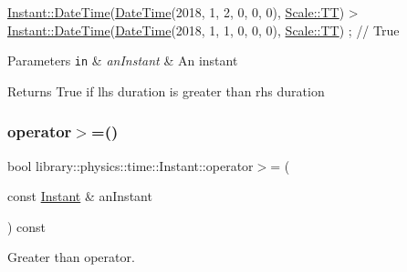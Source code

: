 \begin{DoxyCode}
\hyperlink{classlibrary_1_1physics_1_1time_1_1_instant_ac827b6ffa57ce75a3c56c462d4c872f8}{Instant::DateTime}(\hyperlink{classlibrary_1_1physics_1_1time_1_1_instant_ac827b6ffa57ce75a3c56c462d4c872f8}{DateTime}(2018, 1, 2, 0, 0, 0), 
      \hyperlink{namespacelibrary_1_1physics_1_1time_a09d2bc9fbc7b0b5f92e1419bd655e6bbadf1f3edb9115acb0a1e04209b7a9937b}{Scale::TT}) > \hyperlink{classlibrary_1_1physics_1_1time_1_1_instant_ac827b6ffa57ce75a3c56c462d4c872f8}{Instant::DateTime}(\hyperlink{classlibrary_1_1physics_1_1time_1_1_instant_ac827b6ffa57ce75a3c56c462d4c872f8}{DateTime}(2018, 1, 1, 0, 0, 0), 
      \hyperlink{namespacelibrary_1_1physics_1_1time_a09d2bc9fbc7b0b5f92e1419bd655e6bbadf1f3edb9115acb0a1e04209b7a9937b}{Scale::TT}) ; \textcolor{comment}{// True}
\end{DoxyCode}



\begin{DoxyParams}[1]{Parameters}
\mbox{\tt in}  & {\em an\+Instant} & An instant \\
\hline
\end{DoxyParams}
\begin{DoxyReturn}{Returns}
True if lhs duration is greater than rhs duration 
\end{DoxyReturn}
\mbox{\label{classlibrary_1_1physics_1_1time_1_1_instant_a025f5f159e2a7fb0320c3e0d55cff341}} 
\subsubsection{\texorpdfstring{operator$>$=()}{operator>=()}}
{\footnotesize\ttfamily bool library\+::physics\+::time\+::\+Instant\+::operator$>$= (\begin{DoxyParamCaption}\item[{const \hyperlink{classlibrary_1_1physics_1_1time_1_1_instant}{Instant} \&}]{an\+Instant }\end{DoxyParamCaption}) const}



Greater than operator. 


